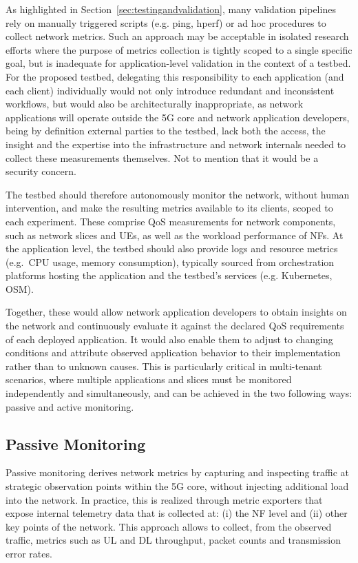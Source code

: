 As highlighted in Section~\ref{sec:testingandvalidation}, many validation pipelines rely on manually triggered scripts (e.g. ping, hperf) or ad hoc procedures to collect network metrics. Such an approach may be acceptable in isolated research efforts where the purpose of metrics collection is tightly scoped to a single specific goal, but is inadequate for application-level validation in the context of a testbed. For the proposed testbed, delegating this responsibility to each application (and each client) individually would not only introduce redundant and inconsistent workflows, but would also be architecturally inappropriate, as network applications will operate outside the \acs{5G} core and network application developers, being by definition external parties to the testbed, lack both the access, the insight and the expertise into the infrastructure and network internals needed to collect these measurements themselves. Not to mention that it would be a security concern.

The testbed should therefore autonomously monitor the network, without human intervention, and make the resulting metrics available to its clients, scoped to each experiment. These comprise \acs{QoS} measurements for network components, such as network slices and \acsp{UE}, as well as the workload performance of \acsp{NF}. At the application level, the testbed should also provide logs and resource metrics (e.g.~\acs{CPU} usage, memory consumption), typically sourced from orchestration platforms hosting the application and the testbed's services (e.g. Kubernetes, \acs{OSM}).

Together, these would allow network application developers to obtain insights on the network and continuously evaluate it against the declared \acs{QoS} requirements of each deployed application. It would also enable them to adjust to changing conditions and attribute observed application behavior to their implementation rather than to unknown causes. This is particularly critical in multi-tenant scenarios, where multiple applications and slices must be monitored independently and simultaneously, and can be achieved in the two following ways: passive and active monitoring.

\subsection{Passive Monitoring}
\label{chap:proposal:observability:passivemonitoring}

Passive monitoring derives network metrics by capturing and inspecting traffic at strategic observation points within the \acs{5G} core, without injecting additional load into the network. In practice, this is realized through metric exporters that expose internal telemetry data that is collected at: (i) the \acs{NF} level and (ii) other key points of the network. This approach allows to collect, from the observed traffic, metrics such as \acs{UL} and \acs{DL} throughput, packet counts and transmission error rates.

